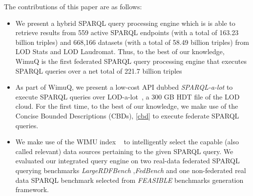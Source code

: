 The contributions of this paper are as follows:
\begin{itemize}
    
    \item We present a hybrid SPARQL query processing engine 
    which is is able to retrieve results from 559 active SPARQL endpoints (with a total of 163.23 billion triples) and 668,166 datasets (with a total of 58.49 billion triples) from LOD Stats and LOD Laudromat. Thus, to the best of our knowledge, WimuQ is the first federated SPARQL query processing engine that executes SPARQL queries over a net total of 221.7 billion triples
    \item As part of WimuQ, we present a low-cost API dubbed \emph{SPARQL-a-lot} to execute SPARQL queries over LOD-a-lot~\cite{fernandez2017lod}, a 300 GB HDT file of the LOD cloud. For the first time, to the best of our knowledge, we make use of the Concise Bounded Descriptions (CBDs), \ref{cbd} to execute federate SPARQL queries.
    \item We make use of the WIMU index ~\cite{valdestilhas2018my} to intelligently select the capable (also called relevant) \cite{hibiscus2014} data sources pertaining to the given SPARQL query. We evaluated our integrated query engine on two real-data federated SPARQL querying benchmarks \emph{LargeRDFBench} \cite{largerdfbench2017},\emph{FedBench} \cite{fedbench2011} and one non-federated real data SPARQL benchmark selected from \emph{FEASIBLE} \cite{feasible2015} benchmarks generation framework. 
    
    
    
    

\end{itemize}
